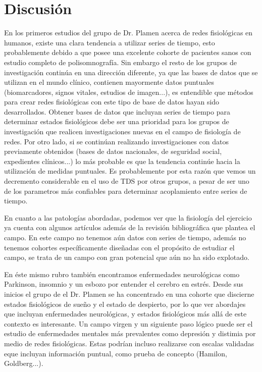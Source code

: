 \documentclass[twoside,twocolumn]{article}
\begin{document}
\section{Discusión}
En los primeros estudios del grupo de Dr. Plamen acerca de redes fisiológicas en humanos, existe una clara tendencia a utilizar series de tiempo, esto probablemente debido a que posee una excelente cohorte de pacientes sanos con estudio completo de polisomnografía\cite{bashan2012network}.
Sin embargo el resto de los grupos de investigación continúa en una dirección diferente, ya que las bases de datos que se utilizan en el mundo clínico, contienen mayormente datos puntuales (biomarcadores, signos vitales, estudios de imagen...), es entendible que métodos para crear redes fisiológicas con este tipo de base de datos hayan sido desarrollados.
Obtener bases de datos que incluyan series de tiempo para determinar estados fisiológicos debe ser una prioridad para los grupos de investigación que realicen investigaciones nuevas en el campo de fisiología de redes.
Por otro lado, si se continúan realizando investigaciones con datos previamente obtenidos (bases de datos nacionales, de seguridad social, expedientes clínicos...) lo más probable es que la tendencia continúe hacia la utilización de medidas puntuales.
Es probablemente por esta razón que vemos un decremento considerable en el uso de TDS por otros grupos, a pesar de ser uno de los parametros más confiables para determinar acoplamiento entre series de tiempo\cite{bartsch2014coexisting}.

En cuanto a las patologías abordadas, podemos ver que la fisiología del ejercicio ya cuenta con algunos artículos\cite{pereira2018computational}\cite{pereira2019complex} además de la revisión bibliográfica que plantea el campo\cite{balague2020network}.
En este campo no tenemos aún datos con series de tiempo, además no tenemos cohortes específicamente diseñadas con el propósito de estudiar el campo, se trata de un campo con gran potencial que aún no ha sido explotado.

En éste mismo rubro también encontramos enfermedades neurológicas como Parkinson\cite{monti2018network}, insomnio \cite{jansen2019network} y un esbozo por entender el cerebro en estrés\cite{zanetti2019information}.
Desde sus inicios el grupo de el Dr. Plamen se ha concentrado en una cohorte que discierne estados fisiológicos de sueño y el estado de despierto, por lo que ver abordajes que incluyan enfermedades neurológicas, y estados fisiológicos más allá de este contexto es interesante.
Un campo virgen y un siguiente paso lógico puede ser el estudio de enfermedades mentales más prevalentes como depresión y distimia por medio de redes fisiológicas. Estas podrían incluso realizarse con escalas validadas eque incluyan información puntual, como prueba de concepto (Hamilon, Goldberg...).
\end{document}
